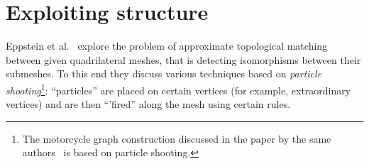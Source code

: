 















\section{Exploiting structure}




Eppstein et al.~\cite{eppstein2008approximate} explore the problem of approximate topological matching between given quadrilateral meshes, that is detecting isomorphisms between their submeshes. To this end they discuss various techniques based on \emph{particle shooting}\footnote{The motorcycle graph construction discussed in the paper by the same authors~\cite{eppstein2008motorcycle} is based on particle shooting.}: ``particles'' are placed on certain vertices (for example, extraordinary vertices) and are then ``'fired'' along the mesh using certain rules.

